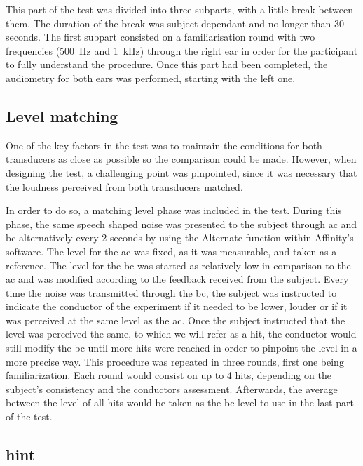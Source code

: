 This part of the test was divided into three subparts, with a little break between them. The duration of the break was subject-dependant and no longer than 30 seconds.
The first subpart consisted on a familiarisation round with two frequencies (\SI{500}{\hertz} and \SI{1}{\kilo\hertz}) through the right ear in order for the participant to fully understand the procedure. Once this part had been completed, the audiometry for both ears was performed, starting with the left one.

\subsection{Level matching}
One of the key factors in the test was to maintain the conditions for both transducers as close as possible so the comparison could be made. However, when designing the test, a challenging point was pinpointed, since it was necessary that the loudness perceived from both transducers matched.

In order to do so, a matching level phase was included in the test. During this phase, the same speech shaped noise was presented to the subject through \gls{ac} and \gls{bc} alternatively every 2 seconds by using the Alternate function within Affinity's software. The level for the \gls{ac} was fixed, as it was measurable, and taken as a reference. The level for the \gls{bc} was started as relatively low in comparison to the \gls{ac} and was modified according to the feedback received from the subject. Every time the noise was transmitted through the \gls{bc}, the subject was instructed to indicate the conductor of the experiment if it needed to be lower, louder or if it was perceived at the same level as the \gls{ac}. Once the subject instructed that the level was perceived the same, to which we will refer as a hit, the conductor would still modify the \gls{bc} until more hits were reached in order to pinpoint the level in a more precise way.
This procedure was repeated in three rounds, first one being familiarization. Each round would consist on up to 4 hits, depending on the subject's consistency and the conductors assessment. Afterwards, the average between the level of all hits would be taken as the \gls{bc} level to use in the last part of the test.


\subsection{\gls{hint}}
